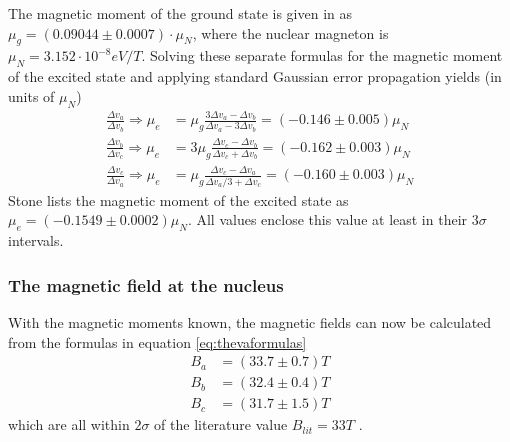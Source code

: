 The magnetic moment of the ground state is given in \cite{stone} as $\mu_g=(0.09044\pm0.0007)\cdot\mu_N$, where the nuclear magneton is $\mu_N=\unit{3.152\cdot10^{-8}}{eV/T}$. Solving these separate formulas for the magnetic moment of the excited state and applying standard Gaussian error propagation yields (in units of $\mu_N$)
\begin{align}
\frac{\Delta v_a}{\Delta v_b}\Rightarrow \mu_e&=\mu_g\frac{3\Delta v_a-\Delta v_b}{\Delta v_a-3\Delta v_b}=\unit{(-0.146\pm0.005)}{\mu_N}\\
\frac{\Delta v_b}{\Delta v_c}\Rightarrow\mu_e&=3\mu_g\frac{\Delta v_c-\Delta v_b}{\Delta v_c+\Delta v_b}=\unit{(-0.162\pm0.003)}{\mu_N}\\
\frac{\Delta v_c}{\Delta v_a}\Rightarrow\mu_e&=\mu_g\frac{\Delta v_c-\Delta v_a}{\Delta v_a/3+\Delta v_c}=\unit{(-0.160\pm0.003)}{\mu_N}
\end{align}
Stone \cite{stone} lists the magnetic moment of the excited state as $\mu_e=\unit{(-0.1549\pm0.0002)}{\mu_N}$.
All values enclose this value at least in their $3\sigma$ intervals. 

\subsubsection{The magnetic field at the nucleus}
With the magnetic moments known, the magnetic fields can now be calculated from the formulas in equation \ref{eq:thevaformulas}
\begin{align}
	B_a&=\unit{(33.7\pm0.7)}{T}\\
	B_b&=\unit{(32.4\pm0.4)}{T}\\
	B_c&=\unit{(31.7\pm1.5)}{T}
\end{align}
which are all within $2\sigma$ of the literature value $B_{lit}=\unit{33}{T}$ \cite{Fultz}.
